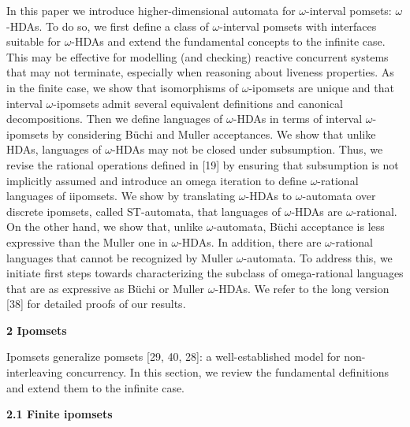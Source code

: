 \documentclass[10pt,a4paper]{article}
\begin{document}
In this paper we introduce higher-dimensional automata for $\omega$-interval pomsets: $\omega$-HDAs. To do so, we first define a class of $\omega$-interval pomsets with interfaces suitable for $\omega$-HDAs and extend the fundamental concepts to the infinite case. This may be effective for modelling (and checking) reactive concurrent systems that may not terminate, especially when reasoning about liveness properties. As in the finite case, we show that isomorphisms of $\omega$-ipomsets are unique and that interval $\omega$-ipomsets admit several equivalent definitions and canonical decompositions. Then we define languages of $\omega$-HDAs in terms of interval $\omega$-ipomsets by considering Büchi and Muller acceptances. We show that unlike HDAs, languages of $\omega$-HDAs may not be closed under subsumption. Thus, we revise the rational operations defined in [19] by ensuring that subsumption is not implicitly assumed and introduce an omega iteration to define $\omega$-rational languages of iipomsets. We show by translating $\omega$-HDAs to $\omega$-automata over discrete ipomsets, called ST-automata, that languages of $\omega$-HDAs are $\omega$-rational. On the other hand, we show that, unlike $\omega$-automata, Büchi acceptance is less expressive than the Muller one in $\omega$-HDAs. In addition, there are $\omega$-rational languages that cannot be recognized by Muller $\omega$-automata. To address this, we initiate first steps towards characterizing the subclass of omega-rational languages that are as expressive as Büchi or Muller $\omega$-HDAs. We refer to the long version [38] for detailed proofs of our results.\par
 
 


 
\par\medskip\noindent\textbf{2 Ipomsets}\par
 
 
Ipomsets generalize pomsets [29, 40, 28]: a well-established model for non-interleaving concurrency. In this section, we review the fundamental definitions and extend them to the infinite case.\par
 
 
 
\par\medskip\noindent\textbf{2.1 Finite ipomsets}\par
 
\end{document}
